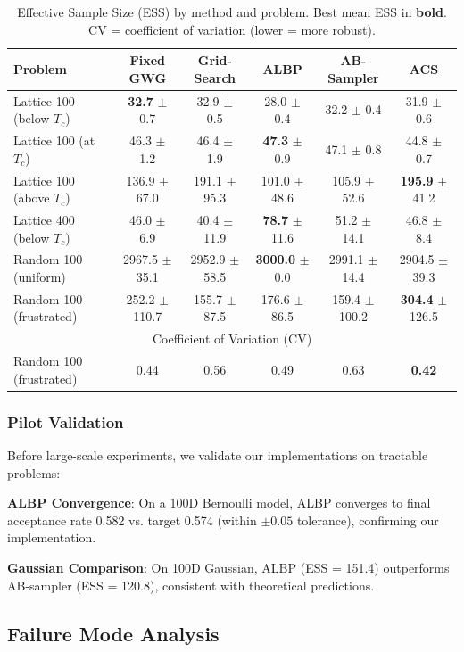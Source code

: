 \documentclass{article}
\begin{document}
\begin{table}[t]
\caption{Effective Sample Size (ESS) by method and problem. Best mean ESS in \textbf{bold}. CV = coefficient of variation (lower = more robust).}
\label{tab:main_results}
\centering
\small
\begin{tabular}{lccccc}
\toprule
Problem & Fixed GWG & Grid-Search & ALBP & AB-Sampler & ACS \\
\midrule
Lattice 100 (below $T_c$) & \textbf{32.7} $\pm$ 0.7 & 32.9 $\pm$ 0.5 & 28.0 $\pm$ 0.4 & 32.2 $\pm$ 0.4 & 31.9 $\pm$ 0.6 \\
Lattice 100 (at $T_c$) & 46.3 $\pm$ 1.2 & 46.4 $\pm$ 1.9 & \textbf{47.3} $\pm$ 0.9 & 47.1 $\pm$ 0.8 & 44.8 $\pm$ 0.7 \\
Lattice 100 (above $T_c$) & 136.9 $\pm$ 67.0 & 191.1 $\pm$ 95.3 & 101.0 $\pm$ 48.6 & 105.9 $\pm$ 52.6 & \textbf{195.9} $\pm$ 41.2 \\
Lattice 400 (below $T_c$) & 46.0 $\pm$ 6.9 & 40.4 $\pm$ 11.9 & \textbf{78.7} $\pm$ 11.6 & 51.2 $\pm$ 14.1 & 46.8 $\pm$ 8.4 \\
Random 100 (uniform) & 2967.5 $\pm$ 35.1 & 2952.9 $\pm$ 58.5 & \textbf{3000.0} $\pm$ 0.0 & 2991.1 $\pm$ 14.4 & 2904.5 $\pm$ 39.3 \\
Random 100 (frustrated) & 252.2 $\pm$ 110.7 & 155.7 $\pm$ 87.5 & 176.6 $\pm$ 86.5 & 159.4 $\pm$ 100.2 & \textbf{304.4} $\pm$ 126.5 \\
\midrule
\multicolumn{6}{c}{Coefficient of Variation (CV)} \\
\midrule
Random 100 (frustrated) & 0.44 & 0.56 & 0.49 & 0.63 & \textbf{0.42} \\
\bottomrule
\end{tabular}
\end{table}

\subsubsection{Pilot Validation}

Before large-scale experiments, we validate our implementations on tractable problems:

\textbf{ALBP Convergence}: On a 100D Bernoulli model, ALBP converges to final acceptance rate 0.582 vs. target 0.574 (within $\pm 0.05$ tolerance), confirming our implementation.

\textbf{Gaussian Comparison}: On 100D Gaussian, ALBP (ESS = 151.4) outperforms AB-sampler (ESS = 120.8), consistent with theoretical predictions.

\subsection{Failure Mode Analysis}
\end{document}
